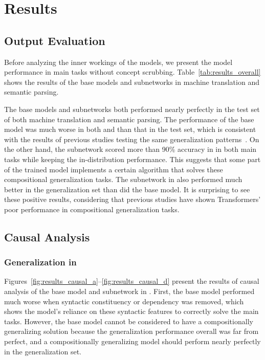 \section{Results}
\label{sec:results}


\subsection{Output Evaluation}
\label{subsec:overall}
Before analyzing the inner workings of the models, we present the model performance in main tasks without concept scrubbing.
Table~\ref{tab:results_overall} shows the results of the base models and subnetworks in machine translation and semantic parsing.

The base models and subnetworks both performed nearly perfectly in the test set of both machine translation and semantic parsing.
The performance of the base model was much worse in both \dobjppiobjpp{} and \dobjppsubjpp{} than that in the test set, which is consistent with the results of previous studies testing the same generalization patterns~\citep{li-etal-2023-slog, kumon-etal-2024-evaluating}.
On the other hand, the subnetwork scored more than 90\% accuracy in \dobjppiobjpp{} in both main tasks while keeping the in-distribution performance.
This suggests that some part of the trained model implements a certain algorithm that solves these compositional generalization tasks.
The subnetwork in \dobjppsubjpp{} also performed much better in the generalization set than did the base model.
It is surprising to see these positive results, considering that previous studies have shown Transformers' poor performance in compositional generalization tasks.

\subsection{Causal Analysis}
\label{subsec:results_causal}

\subsubsection{Generalization in \dobjppiobjpp{}}
Figures~\ref{fig:results_causal_a}--\ref{fig:results_causal_d} present the results of causal analysis of the base model and subnetwork in \dobjppiobjpp{}.
First, the base model performed much worse when syntactic constituency or dependency was removed, which shows the model's reliance on these syntactic features to correctly solve the main tasks.
However, the base model cannot be considered to have a compositionally generalizing solution because the generalization performance overall was far from perfect, and a compositionally generalizing model should perform nearly perfectly in the generalization set.

